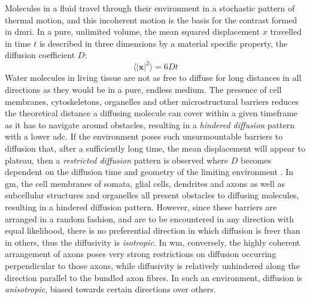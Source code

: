 Molecules in a fluid travel through their environment in a stochastic pattern of thermal motion, and this incoherent motion is the basis for the contrast formed in \gls{dmri}.
In a pure, unlimited volume, the mean squared displacement $x$ travelled in time $t$ is described in three dimensions by a material specific property, the diffusion coefficient $D$:
\begin{equation}
  \langle |\mathbf{x}|^2 \rangle = 6Dt
\end{equation}
Water molecules in living tissue are not as free to diffuse for long distances in all directions as they would be in a pure, endless medium.
The presence of cell membranes, cytoskeletons, organelles and other microstructural barriers reduces the theoretical distance a diffusing molecule can cover within a given timeframe as it has to navigate around obstacles, resulting in a \textit{hindered diffusion} pattern with a lower \gls{adc}.
If the environment poses such unsurmountable barriers to diffusion that, after a sufficiently long time, the mean displacement will appear to plateau, then a \textit{restricted diffusion} pattern is observed where $D$ becomes dependent on the diffusion time and geometry of the limiting environment \autocite{LeBihan1986,LeBihan1995}.
In \gls{gm}, the cell membranes of somata, glial cells, dendrites and axons as well as subcellular structures and organelles all present obstacles to diffusing molecules, resulting in a hindered diffusion pattern.
However, since these barriers are arranged in a random fashion, and are to be encountered in any direction with equal likelihood, there is no preferential direction in which diffusion is freer than in others, thus the diffusivity is \textit{isotropic}.
In \gls{wm}, conversely, the highly coherent arrangement of axons poses very strong restrictions on diffusion occurring perpendicular to those axons, while diffusivity is relatively unhindered along the direction parallel to the bundled axon fibres.
In such an environment, diffusion is \textit{anisotropic}, biased towards certain directions over others.

